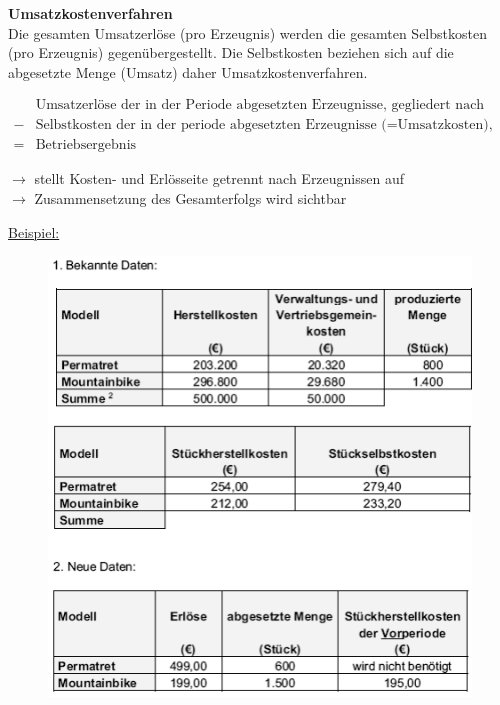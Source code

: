 \documentclass[a4paper,11pt, twoside]{article}
\begin{document}
\textbf{Umsatzkostenverfahren}\\
Die gesamten Umsatzerlöse (pro Erzeugnis) werden die gesamten Selbstkosten (pro Erzeugnis) gegenübergestellt. Die Selbstkosten beziehen sich auf die abgesetzte Menge (Umsatz) daher Umsatzkostenverfahren.

\begin{equation}
\begin{aligned}
 & \text{Umsatzerlöse der in der Periode abgesetzten Erzeugnisse, gegliedert nach Erzeugnisarten}\\
 - & \text{Selbstkosten der in der periode abgesetzten Erzeugnisse (=Umsatzkosten), gegliedert nach Erzeugnisarten}\\\hline
 = & \text{Betriebsergebnis}
 & \end{aligned}
\end{equation}

$\rightarrow$ stellt Kosten- und Erlösseite getrennt nach Erzeugnissen auf\\
$\rightarrow$ Zusammensetzung des Gesamterfolgs wird sichtbar

\underline{Beispiel:}

\begin{figure}[h]
 \begin{center}
   \includegraphics[scale=0.5]{bilder/beispiel_betriebsergebnisrechnung1.png}
 \end{center}
\end{figure}
\end{document}
